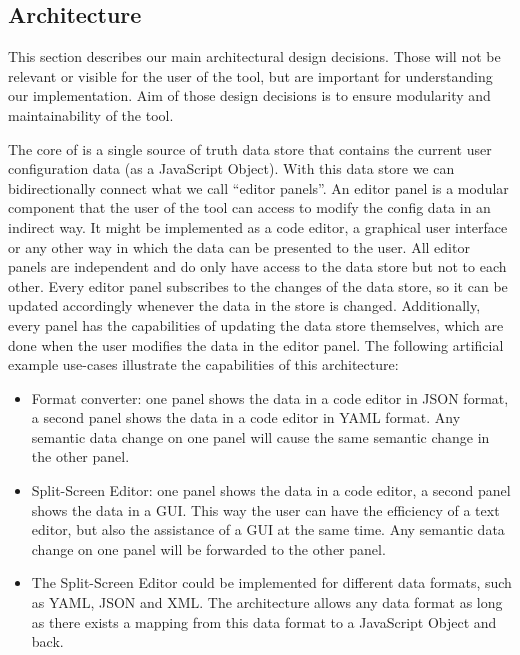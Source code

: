 




\subsection{Architecture}\label{subsec:architecture} %
This section describes our main architectural design decisions.
Those will not be relevant or visible for the user of the tool, but are important for understanding our implementation.
Aim of those design decisions is to ensure modularity and maintainability of the tool.

The core of \toolname{} is a single source of truth data store that contains the current user configuration data (as a JavaScript Object).
With this data store we can bidirectionally connect what we call ``editor panels''.
An editor panel is a modular component that the user of the tool can access to modify the config data in an indirect way.
It might be implemented as a code editor, a graphical user interface or any other way in which the data can be presented to the user.
All editor panels are independent and do only have access to the data store but not to each other.
Every editor panel subscribes to the changes of the data store, so it can be updated accordingly whenever the data in the store is changed.
Additionally, every panel has the capabilities of updating the data store themselves, which are done when the user modifies the data in the editor panel.
The following artificial example use-cases illustrate the capabilities of this architecture:

\begin{itemize}
    \item Format converter: one panel shows the data in a code editor in JSON format, a second panel shows the data in a code editor in YAML format. Any semantic data change on one panel will cause the same semantic change in the other panel.
    \item Split-Screen Editor: one panel shows the data in a code editor, a second panel shows the data in a GUI. This way the user can have the efficiency of a text editor, but also the assistance of a GUI at the same time. Any semantic data change on one panel will be forwarded to the other panel.
    \item The Split-Screen Editor could be implemented for different data formats, such as YAML, JSON and XML. The architecture allows any data format as long as there exists a mapping from this data format to a JavaScript Object and back.
\end{itemize}

